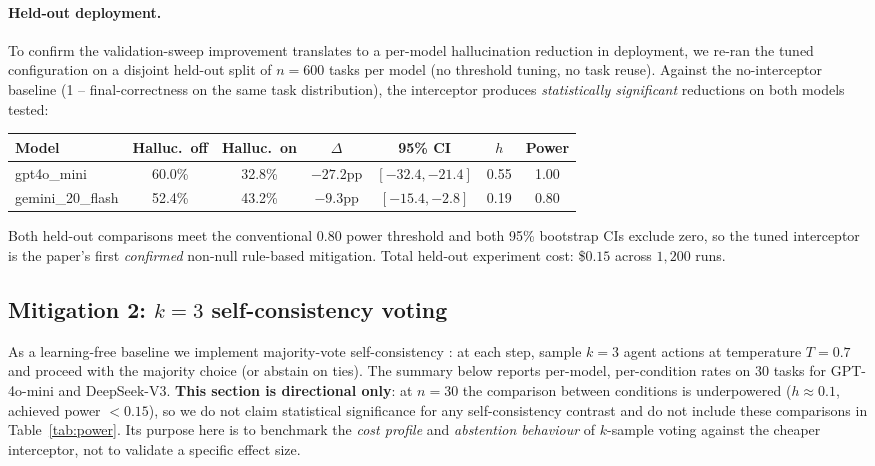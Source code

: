 \documentclass[11pt]{article}
\begin{document}
\paragraph{Held-out deployment.}
To confirm the validation-sweep improvement translates to a per-model hallucination reduction in deployment, we re-ran the tuned configuration on a disjoint held-out split of $n\!=\!600$ tasks per model (no threshold tuning, no task reuse). Against the no-interceptor baseline (1 -- final-correctness on the same task distribution), the interceptor produces \emph{statistically significant} reductions on both models tested:
\begin{center}
\small
\begin{tabular}{lcccccc}
\toprule
Model & Halluc.\ off & Halluc.\ on & $\Delta$ & 95\% CI & $h$ & Power \\
\midrule
gpt4o\_mini       & 60.0\% & 32.8\% & $-27.2$pp & $[-32.4, -21.4]$ & 0.55 & 1.00 \\
gemini\_20\_flash & 52.4\% & 43.2\% & $-9.3$pp  & $[-15.4, -2.8]$  & 0.19 & 0.80 \\
\bottomrule
\end{tabular}
\end{center}
Both held-out comparisons meet the conventional $0.80$ power threshold and both 95\% bootstrap CIs exclude zero, so the tuned interceptor is the paper's first \emph{confirmed} non-null rule-based mitigation. Total held-out experiment cost: \$$0.15$ across $1{,}200$ runs.



\subsection{Mitigation 2: $k\!=\!3$ self-consistency voting}

As a learning-free baseline we implement majority-vote self-consistency \citep{self-consistency}: at each step, sample $k\!=\!3$ agent actions at temperature $T\!=\!0.7$ and proceed with the majority choice (or abstain on ties). The summary below reports per-model, per-condition rates on $30$ tasks for GPT-4o-mini and DeepSeek-V3. \textbf{This section is directional only}: at $n\!=\!30$ the comparison between conditions is underpowered ($h\!\approx\!0.1$, achieved power $<\!0.15$), so we do not claim statistical significance for any self-consistency contrast and do not include these comparisons in Table~\ref{tab:power}. Its purpose here is to benchmark the \emph{cost profile} and \emph{abstention behaviour} of $k$-sample voting against the cheaper interceptor, not to validate a specific effect size.
\end{document}
